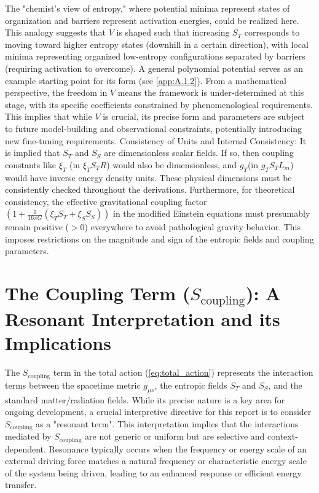 \documentclass[11pt,a4paper]{article} %
\newcommand{\ST}{S_T}
\newcommand{\SSp}{S_S} %
\newcommand{\Scoupling}{S_{\text{coupling}}}
\newcommand{\Lm}{L_m}
\begin{document}
The "chemist's view of entropy," where potential minima represent states of organization and barriers represent activation energies, could be realized here. This analogy suggests that $V$ is shaped such that increasing $\ST$ corresponds to moving toward higher entropy states (downhill in a certain direction), with local minima representing organized low-entropy configurations separated by barriers (requiring activation to overcome). A general polynomial potential serves as an example starting point for its form (see \cref{app:A.1.2}). From a mathematical perspective, the freedom in $V$ means the framework is under-determined at this stage, with its specific coefficients constrained by phenomenological requirements. This implies that while $V$ is crucial, its precise form and parameters are subject to future model-building and observational constraints, potentially introducing new fine-tuning requirements. Consistency of Units and Internal Consistency: It is implied that $\ST$ and $\SSp$ are dimensionless scalar fields. If so, then coupling constants like $\xi_T$ (in $\xi_T\ST R$) would also be dimensionless, and $g_T$(in $g_T\ST\Lm$) would have inverse energy density units. These physical dimensions must be consistently checked throughout the derivations. Furthermore, for theoretical consistency, the effective gravitational coupling factor $(1+\frac{1}{16\pi G}(\xi_T\ST+\xi_S\SSp))$ in the modified Einstein equations must presumably remain positive ($>0$) everywhere to avoid pathological gravity behavior. This imposes restrictions on the magnitude and sign of the entropic fields and coupling parameters.

\section{The Coupling Term ($\Scoupling$): A Resonant Interpretation and its Implications}
The $\Scoupling$ term in the total action (\cref{eq:total_action}) represents the interaction terms between the spacetime metric $g_{\mu\nu}$, the entropic fields $\ST$ and $\SSp$, and the standard matter/radiation fields. While its precise nature is a key area for ongoing development, a crucial interpretive directive for this report is to consider $\Scoupling$ as a "resonant term". This interpretation implies that the interactions mediated by $\Scoupling$ are not generic or uniform but are selective and context-dependent. Resonance typically occurs when the frequency or energy scale of an external driving force matches a natural frequency or characteristic energy scale of the system being driven, leading to an enhanced response or efficient energy transfer.
\end{document}
